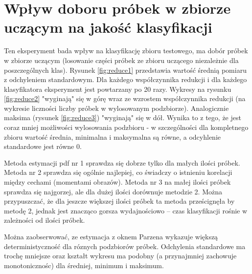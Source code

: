 \documentclass[a4paper]{article}
\begin{document}
\section{Wpływ doboru próbek w zbiorze uczącym na jakość klasyfikacji}

Ten eksperyment bada wpływ na klasyfikację zbioru testowego, ma dobór próbek w zbiorze
uczącym (losowanie części próbek ze zbioru uczącego niezależnie dla poszczególnych klas).
Rysunek \ref{fig:reduce1} przedstawia wartość średnią pomiaru z odchyleniem standardowym.
Dla każdego współczynnika redukcji i dla każdego klasyfikatora eksperyment jest powtarzany po 20 razy.
Wykresy na rysunku \ref{fig:reduce2} "wyginają" się w górę wraz ze wzrostem współczynnika redukcji
(na wykresie liczności liczby próbek w wylosowanym podzbiorze).
Analogicznie maksima (rysunek \ref{fig:reduce3}) "wyginają" się w dół.
Wynika to z tego, że jest coraz mniej możliwości wylosowania podzbioru - w szczególności dla kompletnego zbioru wartość średnia, minimalna i maksymalna są równe,
a odcyhlenie standardowe jest równe 0.

Metoda estymacji pdf nr 1 sprawdza się dobrze tylko dla małych ilości próbek.
Metoda nr 2 sprawdza się ogólnie najlepiej, co świadczy o istnieniu korelacji między cechami (momentami obrazów).
Metoda nr 3 na małej ilości próbek sprawdza się najgorzej, ale dla dużej ilości dorównuje metodzie 2.
Można przypuszczać, że dla jeszcze większej ilości próbek ta metoda prześcignęła by metodę 2,
jednak jest znacząco gorsza wydajnościowo -- czas klasyfikacji rośnie w zależności od ilości próbek.

Można zaobserwować, ze estymacja z oknem Parzena wykazuje większą deterministyczność dla róznych podzbiorów próbek.
Odchylenia standardowe ma trochę mniejsze oraz kształt wykresu ma podobny
(a przynajmniej zachowuje monotonicznośc) dla średniej, minimum i maksimum.
\end{document}
